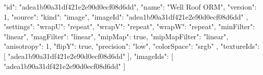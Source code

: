 {
  "id": "adea1b90a31df421e2e90d0ecf08d6dd",
  "name": "Well Roof ORM",
  "version": 1,
  "source": {
    "kind": "image",
    "imageId": "adea1b90a31df421e2e90d0ecf08d6dd"
  },
  "settings": {
    "wrapU": "repeat",
    "wrapV": "repeat",
    "wrapW": "repeat",
    "minFilter": "linear",
    "magFilter": "linear",
    "mipMap": true,
    "mipMapFilter": "linear",
    "anisotropy": 1,
    "flipY": true,
    "precision": "low",
    "colorSpace": "srgb"
  },
  "textureIds": [
    "adea1b90a31df421e2e90d0ecf08d6dd"
  ],
  "imageIds": [
    "adea1b90a31df421e2e90d0ecf08d6dd"
  ]
}
